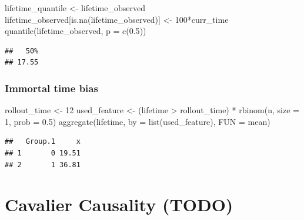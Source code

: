 \documentclass[
]{krantz}
\makeatletter
\newenvironment{Shaded}{\begin{snugshade}}{\end{snugshade}}
\newcommand{\AttributeTok}[1]{\textcolor[rgb]{0.61,0.61,0.61}{#1}}
\newcommand{\DecValTok}[1]{\textcolor[rgb]{0.06,0.06,0.06}{#1}}
\newcommand{\FloatTok}[1]{\textcolor[rgb]{0.06,0.06,0.06}{#1}}
\newcommand{\FunctionTok}[1]{\textcolor[rgb]{0,0,0}{#1}}
\newcommand{\NormalTok}[1]{#1}
\newcommand{\OtherTok}[1]{\textcolor[rgb]{0.37,0.37,0.37}{#1}}
\newcommand{\SpecialCharTok}[1]{\textcolor[rgb]{0,0,0}{#1}}
\newenvironment{kframe}{%
\medskip{}
\setlength{\fboxsep}{.8em}
 \def\at@end@of@kframe{}%
 \ifinner\ifhmode%
  \def\at@end@of@kframe{\end{minipage}}%
  \begin{minipage}{\columnwidth}%
 \fi\fi%
 \def\FrameCommand##1{\hskip\@totalleftmargin \hskip-\fboxsep
 \colorbox{shadecolor}{##1}\hskip-\fboxsep
     \hskip-\linewidth \hskip-\@totalleftmargin \hskip\columnwidth}%
 \MakeFramed {\advance\hsize-\width
   \@totalleftmargin\z@ \linewidth\hsize
   \@setminipage}}%
 {\par\unskip\endMakeFramed%
 \at@end@of@kframe}
\renewenvironment{Shaded}{\begin{kframe}}{\end{kframe}}
\makeatother
\begin{document}
\begin{Shaded}
\begin{Highlighting}[]
\NormalTok{lifetime\_quantile }\OtherTok{\textless{}{-}}\NormalTok{ lifetime\_observed}
\NormalTok{lifetime\_observed[}\FunctionTok{is.na}\NormalTok{(lifetime\_observed)] }\OtherTok{\textless{}{-}} \DecValTok{100}\SpecialCharTok{*}\NormalTok{curr\_time}
\FunctionTok{quantile}\NormalTok{(lifetime\_observed, }\AttributeTok{p =} \FunctionTok{c}\NormalTok{(}\FloatTok{0.5}\NormalTok{))}
\end{Highlighting}
\end{Shaded}

\begin{verbatim}
##   50% 
## 17.55
\end{verbatim}

\hypertarget{immortal-time-bias}{%
\subsection{Immortal time bias}\label{immortal-time-bias}}

\begin{Shaded}
\begin{Highlighting}[]
\NormalTok{rollout\_time }\OtherTok{\textless{}{-}} \DecValTok{12}
\NormalTok{used\_feature }\OtherTok{\textless{}{-}}\NormalTok{ (lifetime }\SpecialCharTok{\textgreater{}}\NormalTok{ rollout\_time) }\SpecialCharTok{*} \FunctionTok{rbinom}\NormalTok{(n, }\AttributeTok{size =} \DecValTok{1}\NormalTok{, }\AttributeTok{prob =} \FloatTok{0.5}\NormalTok{)}
\FunctionTok{aggregate}\NormalTok{(lifetime, }\AttributeTok{by =} \FunctionTok{list}\NormalTok{(used\_feature), }\AttributeTok{FUN =}\NormalTok{ mean)}
\end{Highlighting}
\end{Shaded}

\begin{verbatim}
##   Group.1     x
## 1       0 19.51
## 2       1 36.81
\end{verbatim}

\hypertarget{section}{%
\section{}\label{section}}

\hypertarget{cava-caus}{%
\chapter{Cavalier Causality (TODO)}\label{cava-caus}}
\end{document}
